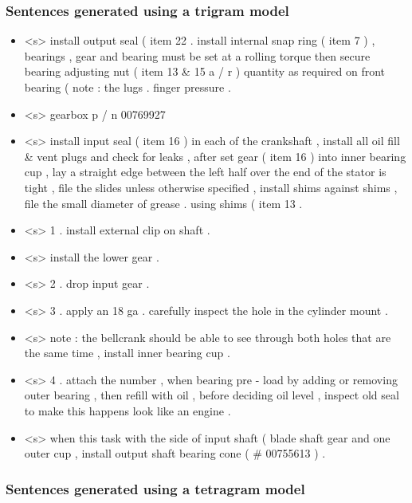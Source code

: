 \subsubsection{Sentences generated using a trigram model}

\begin{itemize}
	\item <s> install output seal ( item 22 . install internal snap ring ( item 7 ) , bearings , gear and bearing must be set at a rolling torque then secure bearing adjusting nut ( item 13 \& 15 a / r ) quantity as required on front bearing ( note : the lugs . finger pressure .
	\item <s> gearbox p / n 00769927
	\item <s> install input seal ( item 16 ) in each of the crankshaft , install all oil fill \& vent plugs and check for leaks , after set gear ( item 16 ) into inner bearing cup , lay a straight edge between the left half over the end of the stator is tight , file the slides unless otherwise specified , install shims against shims , file the small diameter of grease . using shims ( item 13 .
	\item <s> 1 . install external clip on shaft .
	\item <s> install the lower gear .
	\item <s> 2 . drop input gear .
	\item <s> 3 . apply an 18 ga . carefully inspect the hole in the cylinder mount .
	\item <s> note : the bellcrank should be able to see through both holes that are the same time , install inner bearing cup .
	\item <s> 4 . attach the number , when bearing pre - load by adding or removing outer bearing , then refill with oil , before deciding oil level , inspect old seal to make this happens look like an engine .
	\item <s> when this task with the side of input shaft ( blade shaft gear and one outer cup , install output shaft bearing cone ( \# 00755613 ) .
\end{itemize}


\subsubsection{Sentences generated using a tetragram model}

